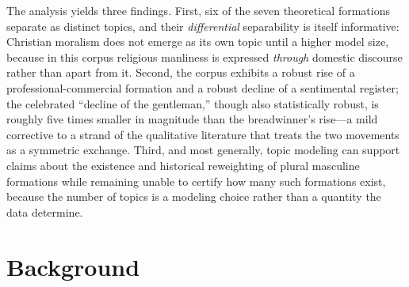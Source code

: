 \documentclass[11pt]{article}
\begin{document}
The analysis yields three findings. First, six of the seven theoretical
formations separate as distinct topics, and their \emph{differential}
separability is itself informative: Christian moralism does not emerge as its own
topic until a higher model size, because in this corpus religious manliness is
expressed \emph{through} domestic discourse rather than apart from it. Second,
the corpus exhibits a robust rise of a professional-commercial formation and a
robust decline of a sentimental register; the celebrated ``decline of the
gentleman,'' though also statistically robust, is roughly five times smaller in
magnitude than the breadwinner's rise---a mild corrective to a strand of the
qualitative literature that treats the two movements as a symmetric exchange.
Third, and most generally, topic modeling
can support claims about the existence and historical reweighting of plural
masculine formations while remaining unable to certify how many such formations
exist, because the number of topics is a modeling choice rather than a quantity
the data determine.

\section{Background}
\end{document}
